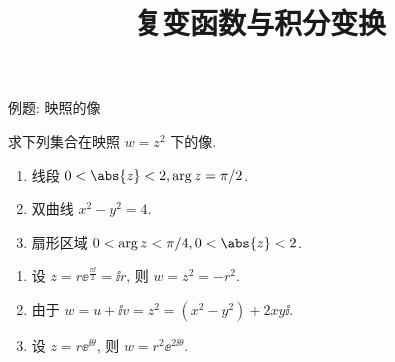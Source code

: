 \documentclass[aspectratio=169]{ctexbeamer}
\title{复变函数与积分变换}
\begin{document}
\begin{frame}{例题: 映照的像}\small
	\pause
	\begin{example}[nearnext]
		求下列集合在映照 $w=z^2$ 下的像.
		\begin{enumerate}
			\item 线段 $0<\abs{z}<2,\arg z=\pi/2$.
			\item 双曲线 $x^2-y^2=4$.
			\item 扇形区域 $0<\arg z<\pi/4,0<\abs{z}<2$.
		\end{enumerate}
	\end{example}
	\pause
	\begin{solution}[nearprev]
		\begin{enumerate}
			\item 设 $z=r\ee^{\frac{\pi\ii}2}=\ii r$, 则 $w=z^2=-r^2$.
			\item 由于 $w=u+\ii v=z^2=(x^2-y^2)+2xy\ii$.
			\item 设 $z=r\ee^{\ii\theta}$, 则 $w=r^2\ee^{2\ii\theta}$.
		\end{enumerate}
	\end{solution}
\end{frame}
\end{document}
